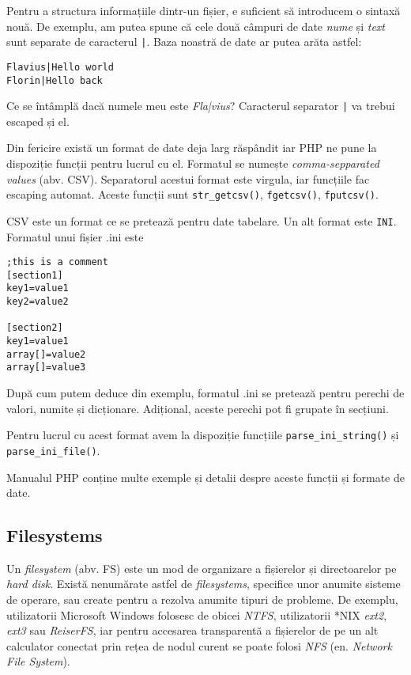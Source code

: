 Pentru a structura informațiile dintr-un fișier, e suficient să
introducem o sintaxă nouă. De exemplu, am putea spune că
cele două c\^ampuri de date \textit{nume} și \textit{text} sunt separate
de caracterul \texttt{|}. {\glqq}Baza noastră de date{\grqq} ar
putea arăta astfel:
\begin{verbatim}
Flavius|Hello world
Florin|Hello back
\end{verbatim}
Ce se \^int\^amplă dacă numele meu este \textsl{Fla|vius}? Caracterul separator
\texttt{|} va trebui escaped și el.

Din fericire există un format de date deja larg răsp\^andit iar PHP ne
pune la dispoziție funcții pentru lucrul cu el. Formatul se numește
\textsl{comma-sepparated values} (abv. CSV).
Separatorul acestui format este virgula, iar funcțiile fac escaping automat. Aceste funcții sunt
\texttt{str\_getcsv()}, \texttt{fgetcsv()}, \texttt{fputcsv()}.

CSV este un format ce se pretează pentru date tabelare. Un alt format este \texttt{INI}. Formatul
unui fișier .ini este
\begin{verbatim}
;this is a comment
[section1]
key1=value1
key2=value2

[section2]
key1=value1
array[]=value2
array[]=value3
\end{verbatim}

După cum putem deduce din exemplu, formatul .ini se pretează pentru perechi de valori,
numite și dicționare. Adițional, aceste perechi pot fi grupate \^in secțiuni.

Pentru lucrul cu acest format avem la dispoziție funcțiile
\texttt{parse\_ini\_string()} și \texttt{parse\_ini\_file()}.

Manualul PHP conține multe exemple și detalii despre aceste funcții
și formate de date.

\subsection{Filesystems}

Un \textsl{filesystem} (abv. FS) este un mod de organizare a fișierelor
și directoarelor pe \textit{hard disk}. Există nenumărate
astfel de \textit{filesystems}, specifice unor anumite
sisteme de operare, sau create pentru a rezolva anumite tipuri
de probleme. De exemplu, utilizatorii Microsoft Windows folosesc
de obicei \textsl{NTFS}, utilizatorii *NIX \textsl{ext2}, \textsl{ext3}
sau \textsl{ReiserFS}, iar pentru accesarea transparentă a fișierelor
de pe un alt calculator conectat prin rețea de nodul curent se
poate folosi \textsl{NFS} (en. \textsl{Network File System}).

